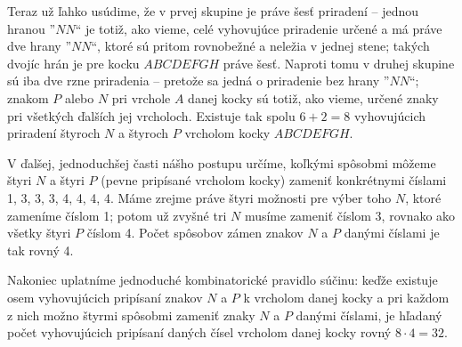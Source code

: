 {Teraz už ľahko usúdime, že v prvej skupine je práve šesť priradení -- jednou hranou ”$NN$“ je totiž, ako vieme, celé vyhovujúce priradenie určené a má práve dve hrany ”$NN$“, ktoré sú pritom rovnobežné a neležia v jednej stene; takých dvojíc hrán je pre kocku $ABCDEFGH$ práve šesť. Naproti tomu v druhej skupine sú iba dve rzne priradenia -- pretože sa jedná o priradenie bez hrany ”$NN$“; znakom $P$ alebo $N$ pri vrchole $A$ danej kocky sú totiž, ako vieme, určené znaky pri všetkých ďalších jej vrcholoch. Existuje tak spolu $6 + 2 = 8$ vyhovujúcich priradení štyroch $N$ a štyroch $P$ vrcholom kocky $ABCDEFGH$.

V ďalšej, jednoduchšej časti nášho postupu určíme, koľkými spôsobmi môžeme štyri $N$ a štyri $P$ (pevne pripísané vrcholom kocky) zameniť konkrétnymi číslami 1, 3, 3, 3, 4, 4, 4, 4. Máme zrejme práve štyri možnosti pre výber toho $N$, ktoré zameníme číslom 1; potom už zvyšné tri $N$ musíme zameniť číslom 3, rovnako ako všetky štyri $P$ číslom 4. Počet spôsobov zámen znakov $N$ a $P$ danými číslami je tak rovný 4.

Nakoniec uplatníme jednoduché kombinatorické pravidlo súčinu: keďže existuje osem vyhovujúcich pripísaní znakov $N$ a $P$ k vrcholom danej kocky a pri každom z nich možno štyrmi spôsobmi zameniť znaky $N$ a $P$ danými číslami, je hľadaný počet vyhovujúcich pripísaní daných čísel vrcholom danej kocky rovný $8 \cdot 4 = 32$.
}